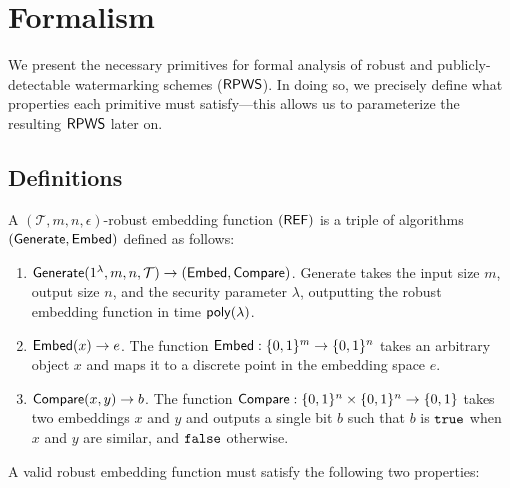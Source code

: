 \documentclass[12pt]{article}
\begin{document}
\section{Formalism}\label{app:formalism}

We present the necessary primitives for formal analysis of robust and publicly-detectable watermarking schemes ($\mathsf{RPWS}$).
In doing so, we precisely define what properties each primitive must satisfy---this allows us to parameterize the resulting $\mathsf{RPWS}$ later on.

\subsection{Definitions}

\begin{definition}\label{def:ref}

A $(\mathcal{T}, m, n, \epsilon)$-robust embedding function $(\mathsf{REF})$ is a triple of algorithms $(\mathsf{Generate}, \mathsf{Embed})$ defined as follows:

\begin{enumerate}
    \item $\mathsf{Generate}(1^\lambda, m, n, \mathcal{T}) \to (\mathsf{Embed}, \mathsf{Compare})$. Generate takes the input size $m$, output size $n$, and the security parameter $\lambda$, outputting the robust embedding function in time $\mathsf{poly}(\lambda)$.
    
    \item $\mathsf{Embed}(x) \to e$. The function $\mathsf{Embed} : \{0,1\}^{m} \to \{0,1\}^{n}$ takes an arbitrary object $x$ and maps it to a discrete point in the embedding space $e$.

    \item $\mathsf{Compare}(x, y) \to b$. The function $\mathsf{Compare}: \{0,1\}^n \times \{0,1\}^n \to \{0,1\}$ takes two embeddings $x$ and $y$ and outputs a single bit $b$ such that $b$ is $\mathtt{true}$ when $x$ and $y$ are similar, and $\mathtt{false}$ otherwise.
\end{enumerate}

A valid robust embedding function must satisfy the following two properties:


\end{definition}
\end{document}
